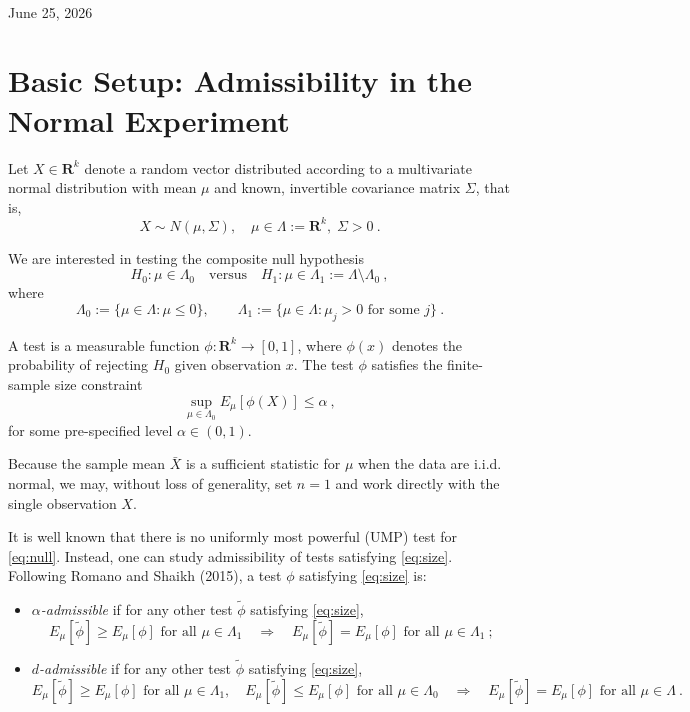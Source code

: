 \documentclass[12pt]{article}
\theoremstyle{definition}
\theoremstyle{remark}
\begin{document}
{}\\
{June 25, 2026}

\section*{Basic Setup: Admissibility in the Normal Experiment}

Let $X \in \mathbf{R}^k$ denote a random vector distributed according to a multivariate normal distribution with mean $\mu$ and known, invertible covariance matrix $\Sigma$, that is,
\[
X \sim N(\mu, \Sigma), \quad \mu \in \Lambda := \mathbf{R}^k, \; \Sigma > 0~.
\]

We are interested in testing the composite null hypothesis
\begin{equation} \label{eq:null}
H_0 : \mu \in \Lambda_0 \quad \text{versus} \quad H_1 : \mu \in \Lambda_1 := \Lambda \setminus \Lambda_0~,
\end{equation}
where
\[
\Lambda_0 := \{ \mu \in \Lambda : \mu \le 0 \}, \qquad \Lambda_1 := \{ \mu \in \Lambda : \mu_j > 0 \text{ for some } j \}~.
\]

A test is a measurable function $\phi : \mathbf{R}^k \to [0,1]$, where $\phi(x)$ denotes the probability of rejecting $H_0$ given observation $x$.  The test $\phi$ satisfies the finite-sample size constraint
\begin{equation} \label{eq:size}
\sup_{\mu \in \Lambda_0} E_\mu[\phi(X)] \leq \alpha~,
\end{equation}
for some pre-specified level $\alpha \in (0,1)$.

Because the sample mean $\bar X$ is a sufficient statistic for $\mu$ when the data are i.i.d. normal, we may, without loss of generality, set $n=1$ and work directly with the single observation $X$.

It is well known that there is no uniformly most powerful (UMP) test for \eqref{eq:null}.  Instead, one can study admissibility of tests satisfying \eqref{eq:size}.  Following Romano and Shaikh (2015), a test $\phi$ satisfying \eqref{eq:size} is:
\begin{itemize}
    \item \emph{$\alpha$-admissible} if for any other test $\tilde \phi$ satisfying \eqref{eq:size},
    \[
    E_\mu[\tilde \phi] \ge E_\mu[\phi] \text{ for all } \mu \in \Lambda_1
    \quad \Rightarrow \quad
    E_\mu[\tilde \phi] = E_\mu[\phi] \text{ for all } \mu \in \Lambda_1~;
    \]
    \item \emph{$d$-admissible} if for any other test $\tilde \phi$ satisfying \eqref{eq:size},
    \[
    E_\mu[\tilde \phi] \ge E_\mu[\phi] \text{ for all } \mu \in \Lambda_1, \quad
    E_\mu[\tilde \phi] \le E_\mu[\phi] \text{ for all } \mu \in \Lambda_0
    \quad \Rightarrow \quad
    E_\mu[\tilde \phi] = E_\mu[\phi] \text{ for all } \mu \in \Lambda~.
    \]
\end{itemize}
\end{document}
